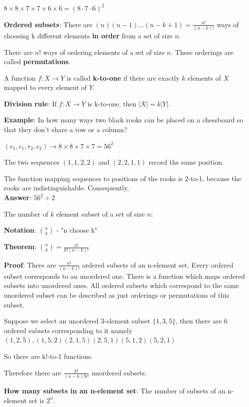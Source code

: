 \documentclass[9pt, letterpaper, oneside]{article}
\begin{document}
$8 \times 8 \times 7 \times 7 \times 6 \times 6 = (8 \cdot 7 \cdot 6)^2$

\textbf{Ordered subsets}: There are $(n)(n-1)...(n-k+1) = \frac{n!}{(n-k)!}$ ways of choosing k different elements \textbf{in order} from a set of size $n$.

There are $n!$ ways of ordering elements of a set of size $n$.  These orderings are called \textbf{permutations}.

A function $f: X \to Y$ is called \textbf{k-to-one} if there are exactly $k$ elements of $X$ mapped to every element of $Y$.

\textbf{Division rule}: If $f: X \to Y$ is k-to-one, then $|X| = k|Y|$.

\textbf{Example}: In how many ways two black rooks can be placed on a chessboard so that they don't share a row or a column?

$(r_1, c_1, r_2, c_2) \to 8 \times 8 \times 7 \times 7 = 56^2$ 

The two sequences $(1,1,2,2)$ and $(2,2,1,1)$ record the same position. 

The function mapping sequences to positions of the rooks is 2-to-1, because the rooks are indistinguishable. Consequently,\\
\textbf{Answer}: $56^2 \div 2$

The number of $k$ element subset of a set of size $n$:

\textbf{Notation}: ${n \choose k}$ - "n choose k"

\textbf{Theorem}: ${n \choose k} = \frac{n!}{k!(n-k)!}$ 

\textbf{Proof}: There are $\frac{n!}{(n-k)!}$ ordered subsets of an n-element set. Every ordered subset corresponds to an unordered one. There is a function which maps ordered subsets into unordered ones.
All ordered subsets which correspond to the same unordered subset can be described as just orderings or permutations of this subset.

Suppose we select an unordered 3-element subset $\{1,3,5\}$, then there are 6 ordered subsets corresponding to it namely $(1,2,5), (1,5,2) (2,1,5) (2,5,1) (5, 1, 2) (5,2,1)$

So there are k!-to-1 functions.

Therefore there are $\frac{k!}{(n-k)!k!}$ unordered subsets.

\textbf{How many subsets in an n-element set}: The number of subsets of an n-element set is $2^n$. %
\end{document}

